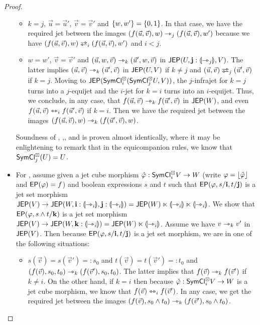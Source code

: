 \documentclass[a4paper]{article}
\begin{document}
\begin{proof}
\begin{itemize}
\begin{itemize}
			\item $k = j$, $\vec u = \vec u'$, $\vec v = \vec v'$ and $\mathopen{}\left\{ w, w' \right\}\mathclose{} = \mathopen{}\left\{ 0, 1 \right\}\mathclose{}$. In that case, we have the required jet between the images $(f(\vec u, \vec v), w) \rightarrowtriangle_j (f(\vec u, \vec v), w')$ because we have $(f(\vec u, \vec v), w) \infrajet_i (f(\vec u, \vec v), w')$ and $i < j$.
			
			\item $w = w'$, $\vec v = \vec v'$ and $(\vec u, w, \vec v) \rightarrowtriangle_k (\vec u', w, \vec v)$ in $\mathsf{JEP}(U, \mathbf{j} : {\llparenthesis \rightarrowtriangle_j \rrparenthesis}, V)$.
			The latter implies $(\vec u, \vec v) \rightarrowtriangle_k (\vec u', \vec v)$ in $\mathsf{JEP}(U, V)$ if $k \neq j$ and $(\vec u, \vec v) \infrajet_j (\vec u', \vec v)$ if $k = j$.
			Moving to \linebreak $\mathsf{JEP}(\mathsf{SymCl}^\boxdot_i(\mathsf{SymCl}^\boxdot_j U, V))$, the $j$-infrajet for $k = j$ turns into a $j$-equijet and the $i$-jet for $k = i$ turns into an $i$-equijet.
			Thus, we conclude, in any case, that $f(\vec u, \vec v) \rightarrowtriangle_k f(\vec u', \vec v)$ in $\mathsf{JEP}(W)$, and even $f(\vec u, \vec v) \leftrightarrowtriangle_i f(\vec u', \vec v)$ if $k = i$.
			Then we have the required jet between the images $(f(\vec u, \vec v), w) \rightarrowtriangle_k (f(\vec u', \vec v), w)$.
		\end{itemize}
		Soundness of , ,,  and  is proven almost identically, where it may be enlightening to remark that in the equicompanion rules, we know that $\mathsf{SymCl}^\boxdot_j(U) = U$.
		
		\item For , assume given a jet cube morphism $\hat {\varphi} : \mathsf{SymCl}^\boxdot_i V \to W$ (write $\varphi = \mathopen{}\left\lfloor \hat {\varphi} \right\rfloor\mathclose{}$ and $\mathsf{EP}(\varphi) = f$) and boolean expressions $s$ and $t$ such that $\mathsf{EP}(\varphi, s/\mathbf{i}, t/\mathbf{j})$ is a jet set morphism $\mathsf{JEP}(V) \to \mathsf{JEP}(W, \mathbf{i} : {\llparenthesis \rightarrowtriangle_i \rrparenthesis}, \mathbf{j} : {\llparenthesis \rightarrowtriangle_i \rrparenthesis}) = \mathsf{JEP}(W) \ltimes {\llparenthesis \rightarrowtriangle_i \rrparenthesis} \ltimes {\llparenthesis \rightarrowtriangle_i \rrparenthesis}$.
		We show that $\mathsf{EP}(\varphi, s \wedge t / \mathbf{k})$ is a jet set morphism $\mathsf{JEP}(V) \to \mathsf{JEP}(W, \mathbf{k} : {\llparenthesis \rightarrowtriangle_i \rrparenthesis}) = \mathsf{JEP}(W) \ltimes {\llparenthesis \rightarrowtriangle_i \rrparenthesis}$.
		Assume we have $v \rightarrowtriangle_k v'$ in $\mathsf{JEP}(V)$. Then because $\mathsf{EP}(\varphi, s/\mathbf{i}, t/\mathbf{j})$ is a jet set morphism, we are in one of the following situations:
		\begin{itemize}
			\item $s(\vec v) = s(\vec v') =: s_0$ and $t(\vec v) = t(\vec v') =: t_0$ and $(f(\vec v), s_0, t_0) \rightarrowtriangle_k (f(\vec v'), s_0, t_0)$.
			The latter implies that $f(\vec v) \rightarrowtriangle_k f(\vec v')$ if $k \neq i$.
			On the other hand, if $k = i$ then because $\hat {\varphi} : \mathsf{SymCl}^\boxdot_i V \to W$ is a jet cube morphism, we know that $f(\vec v) \leftrightarrowtriangle_i f(\vec v')$.
			In any case, we get the required jet between the images $(f(\vec v), s_0 \wedge t_0) \rightarrowtriangle_k (f(\vec v'), s_0 \wedge t_0)$.
			

\end{itemize}
\end{itemize}
\end{proof}
\end{document}

